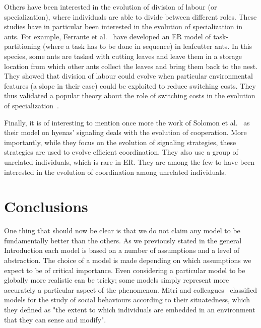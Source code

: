         Others have been interested in the evolution of division of labour (or specialization), where individuals are able to divide between different roles. These studies have in particular been interested in the evolution of specialization in ants. For example, Ferrante et al.~\parencite{Ferrante2015} have developed an ER model of task-partitioning (where a task has to be done in sequence) in leafcutter ants. In this species, some ants are tasked with cutting leaves and leave them in a storage location from which other ants collect the leaves and bring them back to the nest. They showed that division of labour could evolve when particular environmental features (a slope in their case) could be exploited to reduce switching costs. They thus validated a popular theory about the role of switching costs in the evolution of specialization~\parencite{Duarte2011}. 

        Finally, it is of interesting to mention once more the work of Solomon et al.~\parencite{Solomon2012} as their model on hyenas' signaling deals with the evolution of cooperation. More importantly, while they focus on the evolution of signaling strategies, these strategies are used to evolve efficient coordination. They also use a group of unrelated individuals, which is rare in ER. They are among the few to have been interested in the evolution of coordination among unrelated individuals. 


\section{Conclusions}

    One thing that should now be clear is that we do not claim any model to be fundamentally better than the others. As we previously stated in the general Introduction each model is based on a number of assumptions and a level of abstraction. The choice of a model is made depending on which assumptions we expect to be of critical importance. Even considering a particular model to be globally more realistic can be tricky; some models simply represent more accurately a particular aspect of the phenomenon. Mitri and colleagues~\parencite{Mitri2012} classified models for the study of social behaviours according to their situatedness, which they defined as "the extent to which individuals are embedded in an environment that they can sense and modify".

